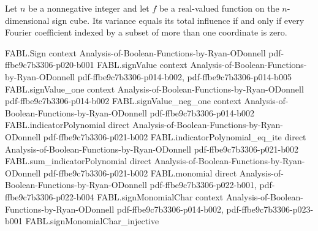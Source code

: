 \begin{theorem}
\label{FABL.variance_eq_totalInfluence_iff}
\leanok
{}
Let $n$ be a nonnegative integer and let $f$ be a real-valued function on the
$n$-dimensional sign cube. Its variance equals its total influence if and only if every
Fourier coefficient indexed by a subset of more than one coordinate is zero.
\end{theorem}

\begin{theorem}
\label{FABL.variance_eq_totalInfluence_iff_fourierWeightAbove_one_eq_zero}
\leanok
{}
\proofstep
  {FABL.Sign}
  {context}
  {Analysis-of-Boolean-Functions-by-Ryan-ODonnell}
  {pdf-ffbe9c7b3306-p020-b001}
\proofstep
  {FABL.signValue}
  {context}
  {Analysis-of-Boolean-Functions-by-Ryan-ODonnell}
  {pdf-ffbe9c7b3306-p014-b002,
    pdf-ffbe9c7b3306-p014-b005}
\proofstep
  {FABL.signValue_one}
  {context}
  {Analysis-of-Boolean-Functions-by-Ryan-ODonnell}
  {pdf-ffbe9c7b3306-p014-b002}
\proofstep
  {FABL.signValue_neg_one}
  {context}
  {Analysis-of-Boolean-Functions-by-Ryan-ODonnell}
  {pdf-ffbe9c7b3306-p014-b002}
\proofstep
  {FABL.indicatorPolynomial}
  {direct}
  {Analysis-of-Boolean-Functions-by-Ryan-ODonnell}
  {pdf-ffbe9c7b3306-p021-b002}
\proofstep
  {FABL.indicatorPolynomial_eq_ite}
  {direct}
  {Analysis-of-Boolean-Functions-by-Ryan-ODonnell}
  {pdf-ffbe9c7b3306-p021-b002}
\proofstep
  {FABL.sum_indicatorPolynomial}
  {direct}
  {Analysis-of-Boolean-Functions-by-Ryan-ODonnell}
  {pdf-ffbe9c7b3306-p021-b002}
\proofstep
  {FABL.monomial}
  {direct}
  {Analysis-of-Boolean-Functions-by-Ryan-ODonnell}
  {pdf-ffbe9c7b3306-p022-b001,
    pdf-ffbe9c7b3306-p022-b004}
\proofstep
  {FABL.signMonomialChar}
  {context}
  {Analysis-of-Boolean-Functions-by-Ryan-ODonnell}
  {pdf-ffbe9c7b3306-p014-b002,
    pdf-ffbe9c7b3306-p023-b001}
\proofstep
  {FABL.signMonomialChar_injective}

\end{theorem}
